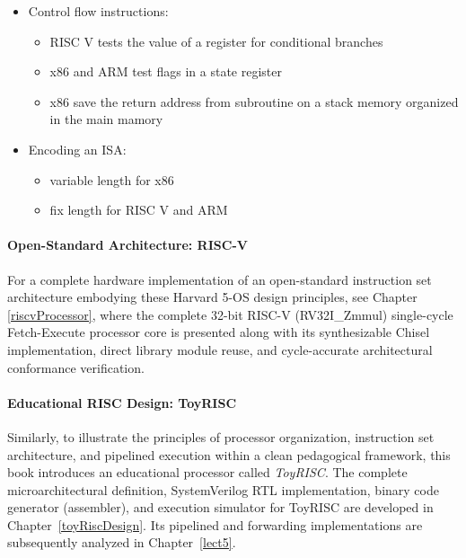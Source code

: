 \begin{itemize}
\begin{itemize}
\begin{itemize}
                    \item floats: add, sub, mult, div, rem
                \end{itemize}
            \item logic: minimally AND and XOR
            \item control: jumps, conditional branches, calls, ret, ...
        \end{itemize}
    \item Control flow instructions:
        \begin{itemize}
            \item RISC V tests the value of a register for conditional branches
            \item x86 and ARM test flags in a state register
            \item x86 save the return address from subroutine on a stack memory organized in the main mamory
        \end{itemize}
    \item Encoding an ISA:
        \begin{itemize}
            \item variable length for x86
            \item fix length for RISC V and ARM
        \end{itemize}
\end{itemize}



\paragraph{Open-Standard Architecture: RISC-V}\label{sec:riscv_intro}
For a complete hardware implementation of an open-standard instruction set architecture embodying these Harvard 5-OS design principles, see Chapter \ref{riscvProcessor}, where the complete 32-bit RISC-V (RV32I\_Zmmul) single-cycle Fetch-Execute processor core is presented along with its synthesizable Chisel implementation, direct library module reuse, and cycle-accurate architectural conformance verification.

\paragraph{Educational RISC Design: ToyRISC}\label{toyrisc}
Similarly, to illustrate the principles of processor organization, instruction set architecture, and pipelined execution within a clean pedagogical framework, this book introduces an educational processor called \textit{ToyRISC}. The complete microarchitectural definition, SystemVerilog RTL implementation, binary code generator (assembler), and execution simulator for ToyRISC are developed in Chapter~\ref{toyRiscDesign}. Its pipelined and forwarding implementations are subsequently analyzed in Chapter~\ref{lect5}.




